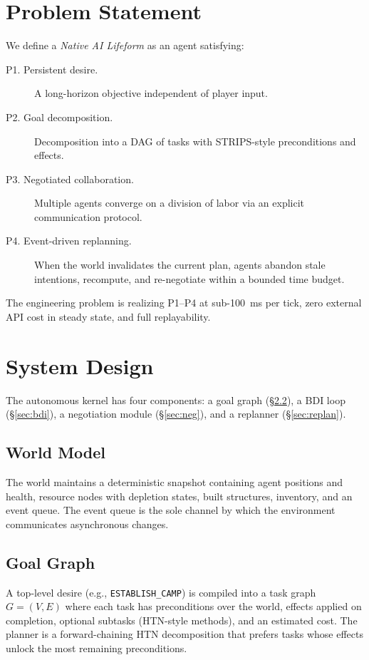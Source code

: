 \documentclass[sigconf, authorversion]{acmart}
\begin{document}
\section{Problem Statement}
We define a \emph{Native AI Lifeform} as an agent satisfying:
\begin{description}
  \item[P1. Persistent desire.] A long-horizon objective independent of
        player input.
  \item[P2. Goal decomposition.] Decomposition into a DAG of tasks with
        STRIPS-style preconditions and effects.
  \item[P3. Negotiated collaboration.] Multiple agents converge on a
        division of labor via an explicit communication protocol.
  \item[P4. Event-driven replanning.] When the world invalidates the
        current plan, agents abandon stale intentions, recompute, and
        re-negotiate within a bounded time budget.
\end{description}
The engineering problem is realizing P1--P4 at sub-100~ms per tick, zero
external API cost in steady state, and full replayability.

\section{System Design}
\label{sec:design}
The autonomous kernel has four components: a goal graph (\S\ref{sec:tg}),
a BDI loop (\S\ref{sec:bdi}), a negotiation module (\S\ref{sec:neg}), and
a replanner (\S\ref{sec:replan}).

\subsection{World Model}
The world maintains a deterministic snapshot containing agent positions
and health, resource nodes with depletion states, built structures,
inventory, and an event queue. The event queue is the sole channel by
which the environment communicates asynchronous changes.

\subsection{Goal Graph}
\label{sec:tg}
A top-level desire (e.g., \texttt{ESTABLISH\_CAMP}) is compiled into a
task graph $G=(V,E)$ where each task has preconditions over the world,
effects applied on completion, optional subtasks (HTN-style methods), and
an estimated cost. The planner is a forward-chaining HTN decomposition
that prefers tasks whose effects unlock the most remaining preconditions.
\end{document}
